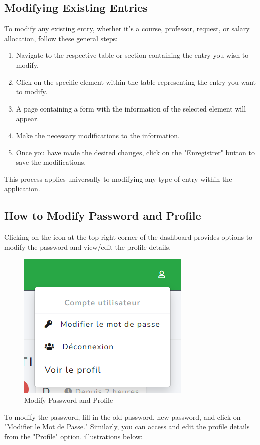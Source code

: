 \documentclass[12pt]{article}
\begin{document}
\subsection{Modifying Existing Entries}

To modify any existing entry, whether it's a course, professor, request, or salary allocation, follow these general steps:

\begin{enumerate}
    \item Navigate to the respective table or section containing the entry you wish to modify.
    \item Click on the specific element within the table representing the entry you want to modify.
    \item A page containing a form with the information of the selected element will appear.
    \item Make the necessary modifications to the information.
    \item Once you have made the desired changes, click on the "Enregistrer" button to save the modifications.
\end{enumerate}

This process applies universally to modifying any type of entry within the application.
\subsection{How to Modify Password and Profile}

Clicking on the icon at the top right corner of the dashboard provides options to modify the password and view/edit the profile details.

\begin{figure}[H]
    \centering
    \includegraphics[width=0.5\linewidth]{image55.png}
    \caption{Modify Password and Profile}
\end{figure}

To modify the password, fill in the old password, new password, and click on "Modifier le Mot de Passe." Similarly, you can access and edit the profile details from the "Profile" option. illustrations below:
\end{document}
